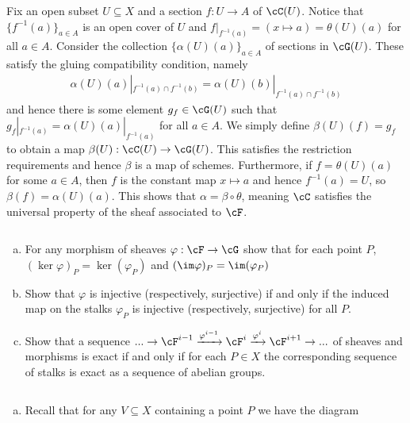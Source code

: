 \begin{homework}[e]
\begin{prf}
		Fix an open subset $U \subseteq X$ and a section $f:U\to A$ of $\cC(U)$. Notice that $\{f^{-1}(a)\}_{a\in A}$ is an open cover of $U$ and $f|_{f^{-1}(a)} = (x\mapsto a) = \theta(U)(a)$ for all $a \in A$. Consider the collection $\{\alpha(U)(a)\}_{a\in A}$ of sections in $\cG(U)$. These satisfy the gluing compatibility condition, namely
		\begin{align*}
			\alpha(U)(a)|_{f^{-1}(a)\cap f^{-1}(b)} = \alpha(U)(b)|_{f^{-1}(a)\cap f^{-1}(b)}
		\end{align*}
		and hence there is some element $g_f \in \cG(U)$ such that $g_f|_{f^{-1}(a)} = \alpha(U)(a)|_{f^{-1}(a)}$ for all $a \in A$. We simply define $\beta(U)(f) = g_f$ to obtain a map $\beta(U):\cC(U)\to \cG(U)$. This satisfies the restriction requirements and hence $\beta$ is a map of schemes. Furthermore, if $f = \theta(U)(a)$ for some $a \in A$, then $f$ is the constant map $x \mapsto a$ and hence $f^{-1}(a) = U$, so $\beta(f) = \alpha(U)(a)$. This shows that $\alpha = \beta\circ \theta$, meaning $\cC$ satisfies the universal property of the sheaf associated to $\cF$.
	\end{prf}
	\prob $ $
	\begin{enumerate}[(a)]
		\item For any morphism of sheaves $\varphi:\cF\to \cG$ show that for each point $P$, $(\ker\varphi)_P = \ker(\varphi_P)$ and $(\im\varphi)_P = \im(\varphi_P)$
		\item Show that $\varphi$ is injective (respectively, surjective) if and only if the induced map on the stalks $\varphi_P$ is injective (respectively, surjective) for all $P$.
		\item Show that a sequence $...\to \cF^{i-1}\xrightarrow{\varphi^{i-1}} \cF^i \xrightarrow{\varphi^i}\cF^{i+1}\to ...$ of sheaves and morphisms is exact if and only if for each $P\in X$ the corresponding sequence of stalks is exact as a sequence of abelian groups.
	\end{enumerate}
	\begin{prf}$ $
		\begin{enumerate}[(a)]
			\item Recall that for any $V\subseteq X$ containing a point $P$ we have the diagram
				\begin{center}

\end{center}
\end{enumerate}
\end{prf}
\end{homework}
